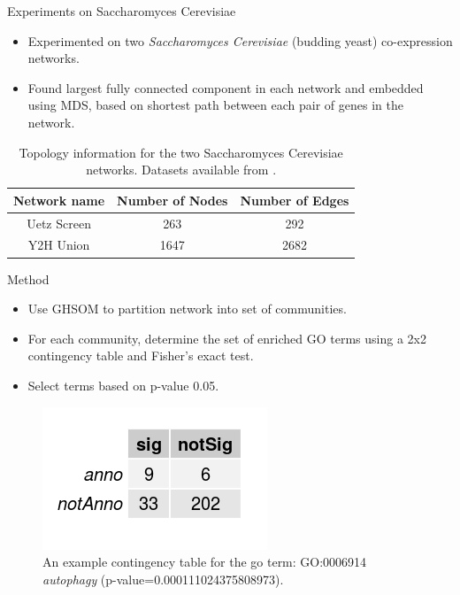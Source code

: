 \documentclass{beamer}
\begin{document}
	\begin{frame}{Experiments on Saccharomyces Cerevisiae}
		\begin{itemize}
			\item Experimented on two \textit{Saccharomyces Cerevisiae} (budding yeast) co-expression networks. 
			\item Found largest fully connected component in each network and embedded using MDS, based on shortest path between each pair of genes in the network.
		\end{itemize}
		\begin{table}
			\centering
			\begin{tabular}{c c c}
				\toprule
				\textbf{Network name} & \textbf{Number of Nodes} & \textbf{Number of Edges} \\ \bottomrule
				Uetz Screen & 263 & 292 \\
				Y2H Union & 1647 & 2682 \\ \bottomrule
			\end{tabular}
			\caption{Topology information for the two Saccharomyces Cerevisiae networks. Datasets available from \protect\cite{uetz,union}.}
			\label{yeast_networks}
		\end{table}
	\end{frame}
	
	\begin{frame}{Method}
		\begin{itemize}
			\item Use GHSOM to partition network into set of communities.
			\item For each community, determine the set of enriched GO terms using a 2x2 contingency table and Fisher's exact test.
			\item Select terms based on p-value 0.05.	
		\end{itemize}
		
		\begin{figure}
			\centering
			\includegraphics[scale=0.7]{contingency_table.png}
			\caption{An example contingency table for the go term: GO:0006914 \textit{autophagy} (p-value=0.000111024375808973).}
		\end{figure}
		
	\end{frame}
	
\end{document}
